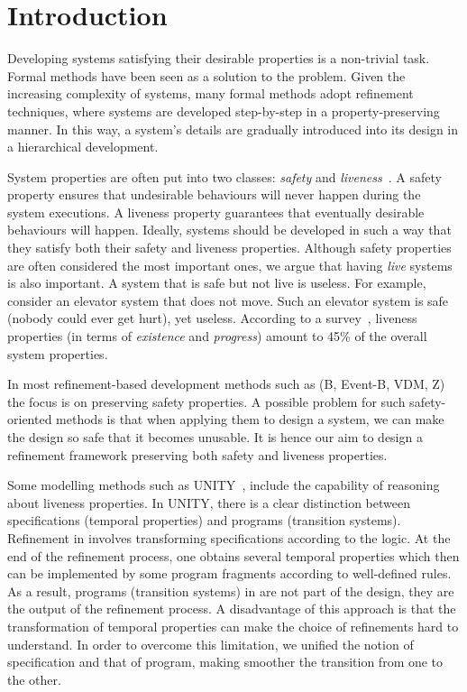 \section{Introduction}
\label{sec:introduction}

Developing systems satisfying their desirable properties is a
non-trivial task.  Formal methods have been seen as a solution to the
problem.  Given the increasing complexity of systems, many
formal methods adopt refinement techniques, where systems are
developed step-by-step in a property-preserving manner.  In this way,
a system's details are gradually introduced into its design in
a hierarchical development.

System properties are often put into two classes: \emph{safety}
and \emph{liveness}~\cite{DBLP:journals/tse/Lamport77}.  A safety
property ensures that undesirable behaviours will never happen
during the system executions.  A liveness property guarantees that
eventually desirable behaviours will happen.  Ideally, systems should
be developed in such a way that they satisfy both their safety and liveness
properties.  Although safety properties are often considered the most
important ones, we argue that having \emph{live} systems is also important.
A system that is safe but not live is useless.  For example, consider
an elevator system that does not move. Such an elevator system is safe
(nobody could ever get hurt), yet useless.  According to a
survey~\cite{DBLP:conf/icse/DwyerAC99}, liveness properties (in terms
of \emph{existence} and \emph{progress}) amount to 45\% of the overall
system properties.

In most refinement-based development methods such as (B, Event-B, VDM,
Z) the focus is on preserving safety properties.  A possible problem
for such safety-oriented methods is that when applying them to design a
system, we can make the design so safe that it becomes unusable.  It is
hence our aim to design a refinement framework preserving both safety
and liveness properties.

Some modelling methods such as UNITY~\cite{DBLP:books/daglib/0067338}, 
include the capability of reasoning about liveness properties.  In UNITY, there is a clear
distinction between specifications (temporal properties) and programs
(transition systems).  Refinement in \unity involves transforming
specifications according to the \unity logic.  At the end of the
refinement process, one obtains several temporal properties which then
can be implemented by some program fragments according to
well-defined rules.  As a result, programs (transition systems) in
\unity are not part of the design, they are the output of the
refinement process.  A disadvantage of this approach is that the
transformation of temporal properties can make the
choice of refinements hard to understand.  In order to overcome 
this limitation, we unified the notion of specification and that of
program, making smoother the transition from one to the other.

